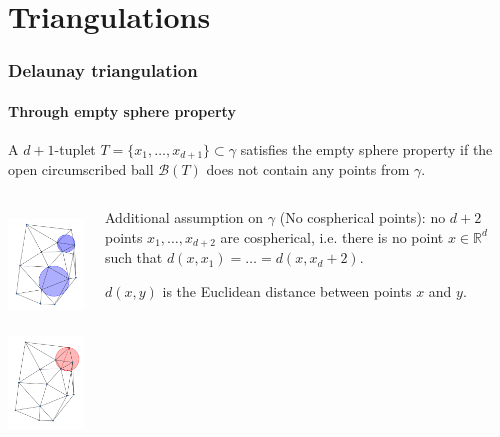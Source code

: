 \documentclass[c, 10pt]{beamer}
\begin{document}
\section{Triangulations}
\framesection{}

\begin{frame}\frametitle{Delaunay triangulation}\framesubtitle{Through empty sphere property}
\begin{small}

A $d+1$-tuplet $T=\{x_1, \dots, x_{d+1}\} \subset \gamma$ satisfies the \alert{empty sphere property} if the open circumscribed ball $\mathcal B(T)$ does not contain any points from $\gamma$. 
\begin{minipage}[0.2\textheight]{\textwidth}
\begin{columns}[T]
\begin{column}{0.4\textwidth}
\begin{center}
\includegraphics[height = 3cm]{./FigureLayout/DelaunayGood.png}
\includegraphics[height = 3cm]{./FigureLayout/DelaunayBad.png}
\end{center}
\end{column}
\begin{column}{0.6\textwidth}
\vspace{10mm}

Additional assumption on $\gamma$ (\alert{No cospherical points}): no $d+2$ points $x_1, \dots, x_{d+2}$ are cospherical, i.e. there is no point $x\in \mathbb R^d$ such that $d(x,x_1)=\dots =d(x,x_d+2)$.\newline

$d(x,y)$ is the Euclidean distance between points $x$ and $y$.
\end{column}
\end{columns}
\end{minipage}
\vspace{3mm}

\end{small}
\end{frame}
\end{document}
